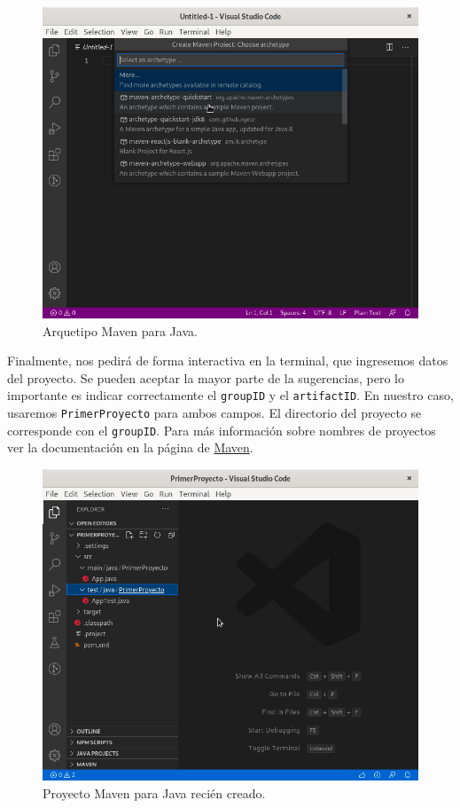 \begin{figure}[t]
	\centering
	\includegraphics[width=.95\textwidth]{img/MavenArchetypeSample}
	\caption{Arquetipo Maven para Java.}
	\label{mavenArch}
\end{figure}

Finalmente, nos pedirá de forma interactiva en la terminal, que ingresemos datos del proyecto. Se pueden aceptar la mayor parte de la sugerencias, pero lo importante es indicar correctamente el \verb|groupID| y el \verb|artifactID|.  En nuestro caso, usaremos \verb|PrimerProyecto| para ambos campos.  El directorio del proyecto se corresponde con el \verb|groupID|.  Para más información sobre nombres de proyectos ver la documentación en la página de \href{https://maven.apache.org/guides/mini/guide-naming-conventions.html}{Maven}.

\begin{figure}[t]
	\centering
	\includegraphics[width=.95\textwidth]{img/MavenProjectoCreado}
	\caption{Proyecto Maven para Java recién creado.}
	\label{mavenSinConf}
\end{figure}

